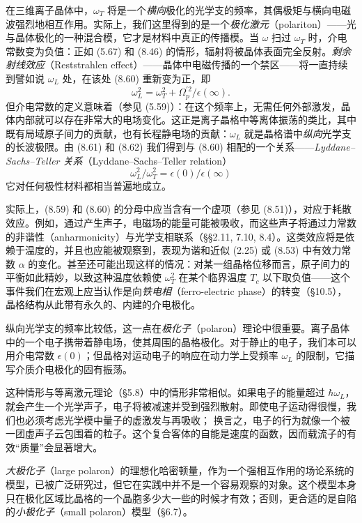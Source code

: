 在三维离子晶体中，$\omega_T$ 将是一个\emph{横向}极化的光学支的频率，其偶极矩与横向电磁波强烈地相互作用。实际上，我们这里得到的是一个\emph{极化激元}（polariton）——光与晶体极化的一种混合模，它才是材料中真正的传播模。当 $\omega$ 扫过 $\omega_T$ 时，介电常数变为负值：正如 (5.67) 和 (8.46) 的情形，辐射将被晶体表面完全反射。\emph{剩余射线效应}（Reststrahlen effect）——晶体中电磁传播的一个禁区——将一直持续到譬如说 $\omega_L$ 处，在该处 (8.60) 重新变为正，即
\begin{equation*}
\omega_L^2 = \omega_T^2 + \Omega_p^{\prime 2}/\epsilon(\infty).\tag{8.62}
\end{equation*}
但介电常数的定义意味着（参见 (5.59)）：在这个频率上，无需任何外部激发，晶体内部就可以存在非常大的电场变化。这正是离子晶格中等离体振荡的类比，其中既有局域原子间力的贡献，也有长程静电场的贡献：$\omega_L$ 就是晶格谱中\emph{纵向}光学支的长波极限。由 (8.61) 和 (8.62) 我们得到与 (8.60) 相配的一个关系——\emph{Lyddane–Sachs–Teller 关系}（Lyddane–Sachs–Teller relation）
\begin{equation*}
\omega_L^2/\omega_T^2 = \epsilon(0)/\epsilon(\infty)\tag{8.63}
\end{equation*}
它对任何极性材料都相当普遍地成立。

实际上，(8.59) 和 (8.60) 的分母中应当含有一个虚项（参见 (8.51)），对应于耗散效应。例如，通过产生声子，电磁场的能量可能被吸收，而这些声子将通过力常数的非谐性（anharmonicity）与光学支相联系（§§2.11, 7.10, 8.4）。这类效应将是依赖于温度的，并且也应能被观察到，表现为谐和近似 (2.25) 或 (8.53) 中有效力常数 $\alpha$ 的变化。甚至还可能出现这样的情况：对某一组晶格位移而言，原子间力的平衡如此精妙，以致这种温度依赖使 $\omega_T^2$ 在某个临界温度 $T_c$ 以下取负值——这个事件我们在宏观上应当认作是向\emph{铁电相}（ferro-electric phase）的转变（§10.5），晶格结构从此带有永久的、内建的介电极化。

纵向光学支的频率比较低，这一点在\emph{极化子}（polaron）理论中很重要。离子晶体中的一个电子携带着静电场，使其周围的晶格极化。对于静止的电子，我们本可以用介电常数 $\epsilon(0)$；但晶格对运动电子的响应在动力学上受频率 $\omega_L$ 的限制，它描写介质介电极化的固有振荡。

这种情形与等离激元理论（§5.8）中的情形非常相似。如果电子的能量超过 $\hbar\omega_L$，就会产生一个光学声子，电子将被减速并受到强烈散射。即使电子运动得很慢，我们也必须考虑光学模中量子的虚激发与再吸收；
换言之，电子的行为就像一个被一团虚声子云包围着的粒子。这个复合客体的自能是速度的函数，因而载流子的有效“质量”会显著增大。

\emph{大极化子}（large polaron）的理想化哈密顿量，作为一个强相互作用的场论系统的模型，已被广泛研究过，但它在实践中并不是一个容易观察的对象。这个模型本身只在极化区域比晶格的一个晶胞多少大一些的时候才有效；否则，更合适的是自陷的\emph{小极化子}（small polaron）模型（§6.7）。

